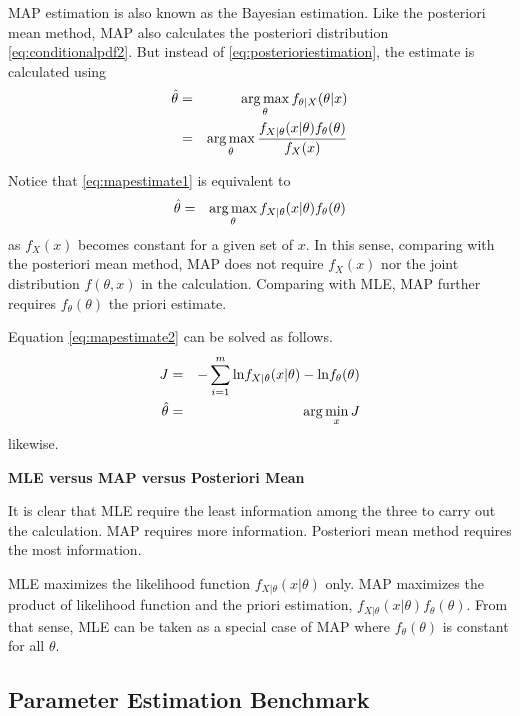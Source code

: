 MAP estimation is also known as the Bayesian estimation. Like the posteriori mean method, MAP also calculates the posteriori distribution \eqref{eq:conditionalpdf2}. But instead of \eqref{eq:posterioriestimation}, the estimate is calculated using
\begin{eqnarray}
	\hat{\theta} &=& \operatorname*{arg\,max}_\theta f_{\theta|X}(\theta|x) \nonumber \\
	&=&  \operatorname*{arg\,max}_\theta \dfrac{f_{X|\theta}(x|\theta)f_\theta(\theta)}{f_X(x)} \label{eq:mapestimate1}
\end{eqnarray}

Notice that \eqref{eq:mapestimate1} is equivalent to
\begin{eqnarray}
	\hat{\theta} &=& \operatorname*{arg\,max}_\theta f_{X|\theta}(x|\theta)f_\theta(\theta) \label{eq:mapestimate2}
\end{eqnarray}
as $f_X(x)$ becomes constant for a given set of $x$. In this sense, comparing with the posteriori mean method, MAP does not require $f_X(x)$ nor the joint distribution $f(\theta, x)$ in the calculation. Comparing with MLE, MAP further requires $f_\theta(\theta)$ the priori estimate.

Equation \eqref{eq:mapestimate2} can be solved as follows.
\begin{eqnarray}
	J &=& -\sum_{i=1}^{m}\textup{ln}f_{X|\theta}(x|\theta) - \textup{ln}f_\theta(\theta) \nonumber \\
	\hat{\theta} &=& \arg\min_{x} J \nonumber
\end{eqnarray}
likewise.

\begin{mdframed}
	\noindent \textbf{MLE versus MAP versus Posteriori Mean}
	
	It is clear that MLE require the least information among the three to carry out the calculation. MAP requires more information. Posteriori mean method requires the most information.
	
	MLE maximizes the likelihood function $f_{X|\theta}(x|\theta)$ only. MAP maximizes the product of likelihood function and the priori estimation, $f_{X|\theta}(x|\theta)f_\theta(\theta)$. From that sense, MLE can be taken as a special case of MAP where $f_\theta(\theta)$ is constant for all $\theta$.
	
\end{mdframed}

\subsection{Parameter Estimation Benchmark}

